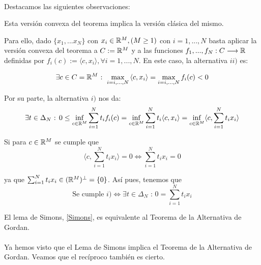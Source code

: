 	\paragraph{} Destacamos las siguientes observaciones:
	
	\begin{observacion}
		Esta versión convexa del teorema implica la versión clásica del mismo.
	\end{observacion}

	Para ello, dado $ \{x_1,...x_N\}$ con $ x_i \in \mathbb{R}^M , (M \geq 1 )$ con $i=1,...,N $ basta aplicar la versión convexa del teorema a $ C := \mathbb{R}^M $ y a las funciones $ f_1,...,f_N : C \longrightarrow \mathbb{R} $ definidas por $ f_i(c):=\langle c,x_i \rangle , \forall i=1,...,N  $. En este caso, la alternativa $ ii) $ es:
	
	\begin{equation*}
		\exists c \in C = \mathbb{R}^M \text{ : } \max_{i=i,...,N} {\langle c,x_i \rangle}  =  \max_{i=i,...,N}f_i (c) < 0 
	\end{equation*}
	
	Por su parte, la alternativa $ i) $ nos da:
	\begin{equation*}
		\exists t \in \Delta_N \text{ : } 0 \leq \inf_{c \in \mathbb{R}^M}  \sum_{i=1}^{N}{t_i f_i(c) } = \inf_{c \in \mathbb{R}^M} \sum_{i=1}^{N}{t_i\langle c,x_i \rangle} = \inf_{c \in \mathbb{R}^M} \langle c, \sum_{i=1}^{N}{t_i x_i} \rangle
	\end{equation*}
	
	Si para $ c \in \mathbb{R}^M $ se cumple que
	\begin{equation*}
		\langle c, \sum_{i=1}^{N}{t_i x_i} \rangle  = 0 \Longleftrightarrow \sum_{i=1}^{N}{t_i x_i} = 0
	\end{equation*}
	
	ya que $ \sum_{i=1}^{N}{t_i x_i} \in (\mathbb{R}^M)^{\perp} = \{0\} $. Así pues, tenemos que
	\begin{equation*}
		\text{Se cumple }i) \Longleftrightarrow \exists t \in \Delta_N \text{ : }  0 = \sum_{i=1}^{N}{t_i x_i}
	\end{equation*}
	
	\begin{observacion}
		El lema de Simons, \ref{Simons}, es equivalente al Teorema de la Alternativa de Gordan.
	\end{observacion}

	\paragraph{} Ya hemos visto que el Lema de Simons implica el Teorema de la Alternativa de Gordan. Veamos que el recíproco también es cierto.  